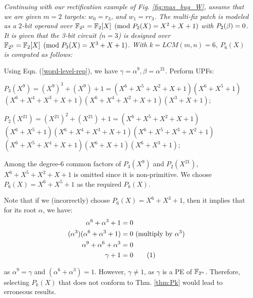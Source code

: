 \begin{Example}
\label{composite_ex}
{\it 
Continuing with our rectification example of Fig. \ref{fig:mas_bug_W},
assume that we are given $m=2$ targets: $w_0=r_3$, and $w_1=rr_3$.
The multi-fix patch is modeled as a $2$-bit
operand over ${\mathbb{F}}_{2^2}={\mathbb{F}}_{2}[X]\pmod{P_2(X)=X^2+X+1}$ with
$P_2(\beta)=0$. It is given that the 3-bit circuit ($n=3$) is designed
over {\small ${\mathbb{F}}_{2^3}={\mathbb{F}}_2[X]\pmod{P_3(X)=X^3+X+1}$}.  
With $k=LCM(m,n)=6$, $P_6(X)$ is computed as follows:

Using Eqn. (\ref{word-level-rep}), we have $\gamma=\alpha^9,\beta=\alpha^{21}$. Perform UPFs:
\bi
\item ${\scriptstyle P_3(X^9) = (X^9)^3+(X^9)+1 =
  (X^6+X^5+X^2+X+1)(X^6+X^5+1)}$\\${\scriptstyle(X^6+X^4+X^3+X+1)(X^6+X^4+X^2+X+1)(X^3+X+1);}$
\item ${\scriptstyle P_2(X^{21}) = (X^{21})^2+(X^{21})+1 =
  (X^6+X^5+X^2+X+1)}$\\${\scriptstyle (X^6+X^5+1)(X^6+X^4+X^3+X+1)(X^6+X^5+X^3+X^2+1)
  }$\\${\scriptstyle(X^6+X^5+X^4+X+1)(X^6+X+1)(X^6+X^3+1);}$
\ei

Among the degree-6 common factors of ${\scriptstyle P_3(X^9)}$ and
${\scriptstyle P_2(X^{21})}$,  ${\scriptstyle X^6+X^5+X^2+X+1}$ is omitted
since it is non-primitive.  We choose ${\scriptstyle P_6(X) =
  X^6+X^5+1}$ as the required $P_k(X)$. 

Note that if we (incorrectly) choose ${\scriptstyle P_6(X)=X^6 + X^3 +1}$, then it
implies that for its root $\alpha$, we have:
\begin{align*}
\alpha^6 + \alpha^3 + 1 &= 0\\
 (\alpha^3)(\alpha^6 +\alpha^3 + 1) &= 0 ~(\text{multiply by}~\alpha^3)\\
\alpha^9 + \alpha^6 + \alpha^3 &= 0 \\
 \gamma + 1 &= 0
\stepcounter{equation}\tag{\theequation}\label{ll} 
\end{align*}

as $\alpha^9 = \gamma$ and $(\alpha^6 + \alpha^3) = 1$. However,
$\gamma \neq 1$, as $\gamma$ is a PE of ${\mathbb{F}}_{2^n}$. Therefore, selecting
$P_k(X)$ that does not conform to Thm. \ref{thm:Pk} would lead to
erroneous results.
}
\end{Example}
